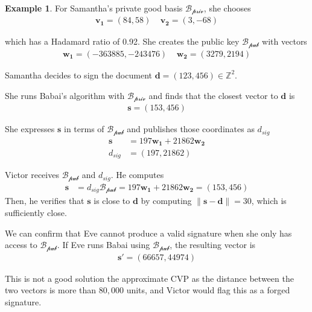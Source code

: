 \documentclass[11pt,reqno]{amsart}
\theoremstyle{definition}
\newtheorem{example}[theorem]{Example}
\begin{document}
\begin{example}
    \label{ex1}
    For Samantha's private good basis $\mathcal{B_\text{priv}}$, she chooses
    \begin{align*}
        \mathbf{v_1} = (84,58) \;\;\;\; \mathbf{v_2} = (3,-68)
    \end{align*}
    
    which has a Hadamard ratio of 0.92. She creates the public key $\mathcal{B_\text{pub}}$ with vectors 
    \begin{align*}
        \mathbf{w_1} = (-363885,-243476) \;\;\;\; \mathbf{w_2} = (3279,2194)
    \end{align*}
    
    Samantha decides to sign the document $\mathbf{d} = (123,456) \in \mathbb{Z}^2$.

    She runs Babai's algorithm with $\mathcal{B_\text{priv}}$ and finds that the closest vector to $\mathbf{d}$ is
    \begin{align*}
        \mathbf{s} = (153,456)
    \end{align*}
     
    She expresses $\mathbf{s}$ in terms of $\mathcal{B_\text{pub}}$ and publishes those coordinates as $d_{sig}$
    \begin{align*}
        \mathbf{s} &= 197\mathbf{w_1} + 21862\mathbf{w_2} \\
        d_{sig} &=  (197,21862)
    \end{align*}
    

    Victor receives $\mathcal{B_\text{pub}}$ and $d_{sig}$. He computes
    \begin{align*}
        \mathbf{s} &= d_{sig}\mathcal{B_\text{pub}} = 197\mathbf{w_1} + 21862\mathbf{w_2} = (153,456)
    \end{align*}
     Then, he verifies that $\mathbf{s}$ is close to $\mathbf{d}$ by computing $
         \| \mathbf{s} - \mathbf{d} \| = 30$,
     which is sufficiently close. 

    We can confirm that Eve cannot produce a valid signature when she only has access to $\mathcal{B_\text{pub}}$. If Eve runs Babai using $\mathcal{B_\text{pub}}$, the resulting vector is 
    \begin{align*}
        \mathbf{s'} = (66657,44974)
    \end{align*}
    
    This is not a good solution the approximate CVP as the distance between the two vectors is more than $80,000$ units, and Victor would flag this as a forged signature.

    \end{example}
\end{document}

